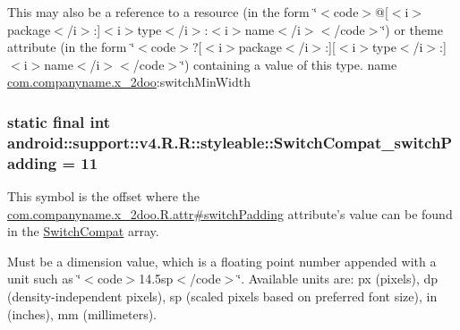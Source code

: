This may also be a reference to a resource (in the form \char`\"{}$<$code$>$@\mbox{[}$<$i$>$package$<$/i$>$:\mbox{]}$<$i$>$type$<$/i$>$:$<$i$>$name$<$/i$>$$<$/code$>$\char`\"{}) or theme attribute (in the form \char`\"{}$<$code$>$?\mbox{[}$<$i$>$package$<$/i$>$:\mbox{]}\mbox{[}$<$i$>$type$<$/i$>$:\mbox{]}$<$i$>$name$<$/i$>$$<$/code$>$\char`\"{}) containing a value of this type.  name \hyperlink{namespacecom_1_1companyname_1_1x__2doo}{com.companyname.x\_\-2doo}:switchMinWidth \hypertarget{classandroid_1_1support_1_1v4_1_1_r_1_1styleable_86212afa1c1fecc95d7678773e2d9e52}{
\subsubsection[{SwitchCompat\_\-switchPadding}]{\setlength{\rightskip}{0pt plus 5cm}static final int android::support::v4.R.R::styleable::SwitchCompat\_\-switchPadding = 11}}
\label{classandroid_1_1support_1_1v4_1_1_r_1_1styleable_86212afa1c1fecc95d7678773e2d9e52}


This symbol is the offset where the \hyperlink{classcom_1_1companyname_1_1x__2doo_1_1_r_1_1attr_1e66affd3e0c2e3e52c1eb8fb8acac00}{com.companyname.x\_\-2doo.R.attr\#switchPadding} attribute's value can be found in the \hyperlink{classandroid_1_1support_1_1v4_1_1_r_1_1styleable_276d9c1ec80821a3e0fcdaa41daa75a0}{SwitchCompat} array.

Must be a dimension value, which is a floating point number appended with a unit such as \char`\"{}$<$code$>$14.5sp$<$/code$>$\char`\"{}. Available units are: px (pixels), dp (density-independent pixels), sp (scaled pixels based on preferred font size), in (inches), mm (millimeters). 

